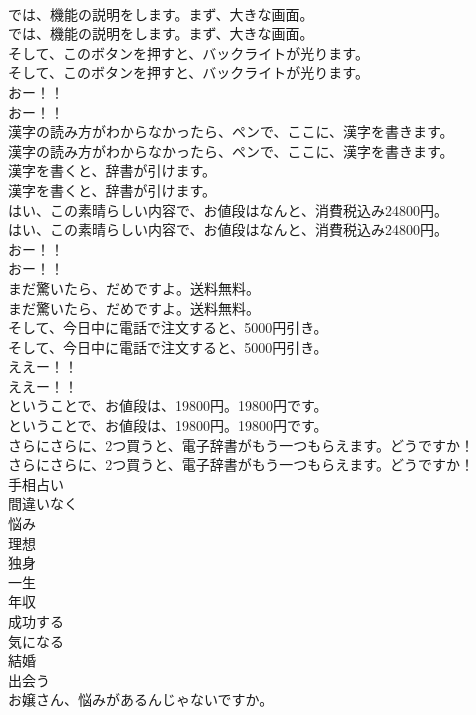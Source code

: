 \documentclass[8pt]{extreport}
\begin{document}
\begin{CJK}{UTF8}{min}
\\	では、機能の説明をします。まず、大きな画面。	
\\	では、機能の説明をします。まず、大きな画面。 
\\	そして、このボタンを押すと、バックライトが光ります。	
\\	そして、このボタンを押すと、バックライトが光ります。 
\\	おー！！	
\\	おー！！ 
\\	漢字の読み方がわからなかったら、ペンで、ここに、漢字を書きます。	
\\	漢字の読み方がわからなかったら、ペンで、ここに、漢字を書きます。 
\\	漢字を書くと、辞書が引けます。	
\\	漢字を書くと、辞書が引けます。 
\\	はい、この素晴らしい内容で、お値段はなんと、消費税込み24800円。	
\\	はい、この素晴らしい内容で、お値段はなんと、消費税込み24800円。 
\\	おー！！	
\\	おー！！ 
\\	まだ驚いたら、だめですよ。送料無料。	
\\	まだ驚いたら、だめですよ。送料無料。 
\\	そして、今日中に電話で注文すると、5000円引き。	
\\	そして、今日中に電話で注文すると、5000円引き。 
\\	ええー！！	
\\	ええー！！ 
\\	ということで、お値段は、19800円。19800円です。	
\\	ということで、お値段は、19800円。19800円です。 
\\	さらにさらに、2つ買うと、電子辞書がもう一つもらえます。どうですか！	
\\	さらにさらに、2つ買うと、電子辞書がもう一つもらえます。どうですか！ 
\\	手相占い
\\	間違いなく
\\	悩み
\\	理想
\\	独身
\\	一生
\\	年収
\\	成功する
\\	気になる
\\	結婚
\\	出会う
\\	お嬢さん、悩みがあるんじゃないですか。	

\end{CJK}
\end{document}

